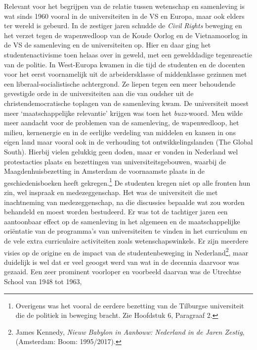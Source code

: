 \documentclass[smallauthor, chapterhaspagenum, nochapterinheader, pagenuminheader,  bigchapnum,medium2, tocpages,  garamond, titleinheader]{jote-book}
\begin{document}
	Relevant voor het begrijpen van de relatie tussen wetenschap en samenleving is wat sinds 1960 vooral in de universiteiten in de VS en Europa, maar ook elders ter wereld is gebeurd. In de zestiger jaren schudde de \emph{Civil}\emph{ }\emph{Rights} beweging en het verzet tegen de wapenwedloop van de Koude Oorlog en de Vietnamoorlog in de VS de samenleving en de universiteiten op. Hier en daar ging het studentenactivisme toen helaas over in geweld, met een gewelddadige tegenreactie van de politie. In West-Europa kwamen in die tijd de studenten en de docenten voor het eerst voornamelijk uit de arbeidersklasse of middenklasse gezinnen met een liberaal-socialistische achtergrond. Ze liepen tegen een meer behoudende gevestigde orde in de universiteiten aan die van oudsher uit de christendemocratische toplagen van de samenleving kwam. De universiteit moest meer ‘maatschappelijke relevantie' krijgen was toen het \emph{buzz}-woord. Men wilde meer aandacht voor de problemen van de samenleving, de wapenwedloop, het milieu, kernenergie en in de eerlijke verdeling van middelen en kansen in ons eigen land maar vooral ook in de verhouding tot ontwikkelingslanden (The Global South). Hierbij vielen gelukkig geen doden, maar er vonden in Nederland wel protestacties plaats en bezettingen van universiteitsgebouwen, waarbij de Maagdenhuisbezetting in Amsterdam de voornaamste plaats in de geschiedenisboeken heeft gekregen.\footnote{Overigens was het vooral de eerdere bezetting van de Tilburgse universiteit die de politiek in beweging bracht. Zie Hoofdstuk 6, Paragraaf 2.} De studenten kregen niet op alle fronten hun zin, wel inspraak en medezeggenschap. Het was de universiteit die met inachtneming van medezeggenschap, na die discussies bepaalde wat zou worden behandeld en moest worden bestudeerd. Er was tot de tachtiger jaren een aantoonbaar effect op de samenleving in het algemeen en de maatschappelijke oriëntatie van de programma's van universiteiten te vinden in het curriculum en de vele extra curriculaire activiteiten zoals wetenschapswinkels. Er zijn meerdere visies op de origine en de impact van de studentenbeweging in Nederland\footnote{James Kennedy, \emph{Nieuw Babylon in Aanbouw: Nederland in de Jaren Zestig}, (Amsterdam: Boom: 1995/2017).}, maar duidelijk is wel dat er veel geoogst werd van wat in de decennia daarvoor was gezaaid. Een zeer prominent voorloper en voorbeeld daarvan was de Utrechtse School van 1948 tot 1963,
\end{document}
